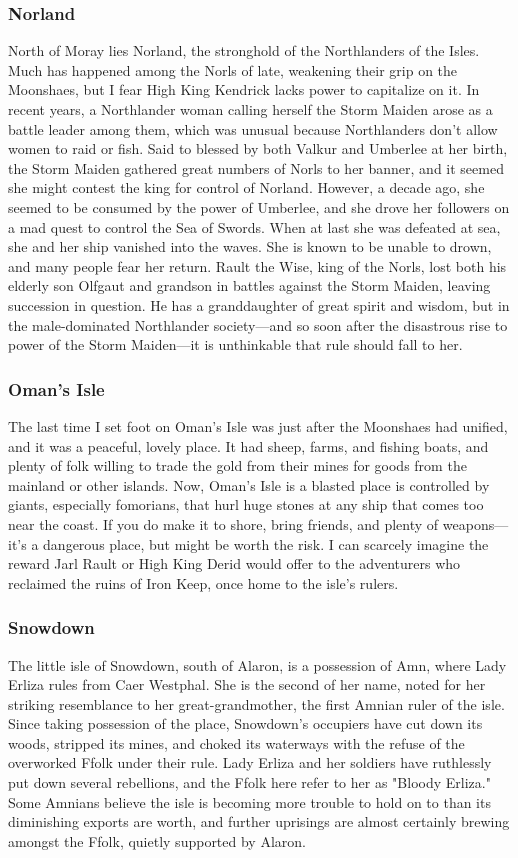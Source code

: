 \documentclass[10pt,a4paper,twoside,twocolumn,openany,bg=print,nodeprecatedcode]{dndbook}
\begin{document}
\subsubsection{Norland}
North of Moray lies Norland, the stronghold of the Northlanders of the Isles. Much has happened among the Norls of late, weakening their grip on the Moonshaes, but I fear High King Kendrick lacks power to capitalize on it.
In recent years, a Northlander woman calling herself the Storm Maiden arose as a battle leader among them, which was unusual because Northlanders don't allow women to raid or fish. Said to blessed by both Valkur and Umberlee at her birth, the Storm Maiden gathered great numbers of Norls to her banner, and it seemed she might contest the king for control of Norland. However, a decade ago, she seemed to be consumed by the power of Umberlee, and she drove her followers on a mad quest to control the Sea of Swords. When at last she was defeated at sea, she and her ship vanished into the waves. She is known to be unable to drown, and many people fear her return.
Rault the Wise, king of the Norls, lost both his elderly son Olfgaut and grandson in battles against the Storm Maiden, leaving succession in question. He has a granddaughter of great spirit and wisdom, but in the male-dominated Northlander society—and so soon after the disastrous rise to power of the Storm Maiden—it is unthinkable that rule should fall to her.
\subsubsection{Oman's Isle}
The last time I set foot on Oman's Isle was just after the Moonshaes had unified, and it was a peaceful, lovely place. It had sheep, farms, and fishing boats, and plenty of folk willing to trade the gold from their mines for goods from the mainland or other islands. Now, Oman's Isle is a blasted place is controlled by giants, especially fomorians, that hurl huge stones at any ship that comes too near the coast. If you do make it to shore, bring friends, and plenty of weapons—it's a dangerous place, but might be worth the risk. I can scarcely imagine the reward Jarl Rault or High King Derid would offer to the adventurers who reclaimed the ruins of Iron Keep, once home to the isle's rulers.
\subsubsection{Snowdown}
The little isle of Snowdown, south of Alaron, is a possession of Amn, where Lady Erliza rules from Caer Westphal. She is the second of her name, noted for her striking resemblance to her great-grandmother, the first Amnian ruler of the isle.
Since taking possession of the place, Snowdown's occupiers have cut down its woods, stripped its mines, and choked its waterways with the refuse of the overworked Ffolk under their rule. Lady Erliza and her soldiers have ruthlessly put down several rebellions, and the Ffolk here refer to her as "Bloody Erliza." Some Amnians believe the isle is becoming more trouble to hold on to than its diminishing exports are worth, and further uprisings are almost certainly brewing amongst the Ffolk, quietly supported by Alaron.
\end{document}
